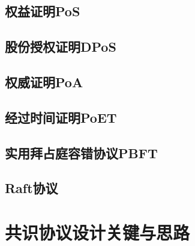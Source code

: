 \subsection{权益证明PoS}

\subsection{股份授权证明DPoS}

\subsection{权威证明PoA}

\subsection{经过时间证明PoET}

\subsection{实用拜占庭容错协议PBFT}

\subsection{Raft协议}

\section{共识协议设计关键与思路}